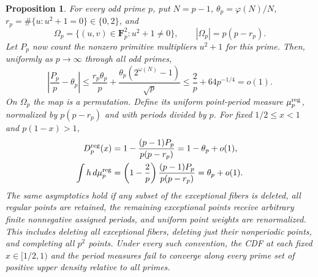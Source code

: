 \documentclass[11pt]{article}
\newtheorem{proposition}[theorem]{Proposition}
\theoremstyle{remark}
\newcommand{\Fp}{\mathbf F_p}
\begin{document}
\begin{proposition}\label{prop:allodd}
For every odd prime $p$, put $N=p-1$, $\theta_p=\varphi(N)/N$,
$r_p=\#\{u:u^2+1=0\}\in\{0,2\}$, and
\[
 \Omega_p=\{(u,v)\in\Fp^2:u^2+1\ne0\},\qquad
 |\Omega_p|=p(p-r_p).
\]
Let $P_p$ now count the nonzero primitive multipliers $u^2+1$ for this
prime. Then, uniformly as $p\to\infty$ through all odd primes,
\begin{equation}\label{eq:allprimitive}
 \left|\frac{P_p}{p}-\theta_p\right|
 \le\frac{r_p\theta_p}{p}
    +\frac{\theta_p(2^{\omega(N)}-1)}{\sqrt p}
 \le\frac2p+64p^{-1/4}=o(1).
\end{equation}
On $\Omega_p$ the map is a permutation. Define its uniform point-period
measure $\mu_p^{\rm reg}$, normalized by $p(p-r_p)$ and with periods
divided by $p$. For fixed $1/2\le x<1$ and $p(1-x)>1$,
\begin{align}
 D_p^{\rm reg}(x)
 &=1-\frac{(p-1)P_p}{p(p-r_p)}=1-\theta_p+o(1),\label{eq:allcdf}\\
 \int h\,d\mu_p^{\rm reg}
 &=\left(1-\frac2p\right)\frac{(p-1)P_p}{p(p-r_p)}
   =\theta_p+o(1).\label{eq:allmoment}
\end{align}
The same asymptotics hold if any subset of the exceptional fibers is
deleted, all regular points are retained, the remaining exceptional
points receive arbitrary finite nonnegative assigned periods, and
uniform point weights are renormalized. This includes deleting all
exceptional fibers, deleting just their nonperiodic points, and completing
all $p^2$ points. Under every such convention, the CDF at each fixed
$x\in[1/2,1)$ and the period measures fail to converge along every prime
set of positive upper density relative to all primes.
\end{proposition}
\end{document}
